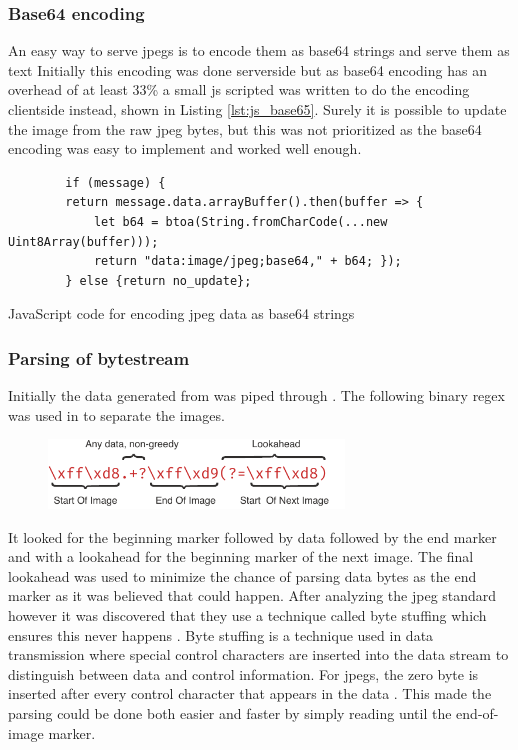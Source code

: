 \subsubsection{Base64 encoding}
An easy way to serve \glspl{jpeg} is to encode them as base64 strings and serve them as text \cite{rAnswerHowDisplay2013}
Initially this encoding was done serverside but as base64 encoding has an overhead of at least 33\% a small \gls{js} scripted was written to do the encoding clientside instead, shown in Listing \ref{lst:js_base65}.
Surely it is possible to update the image from the raw \gls{jpeg} bytes, but this was not prioritized as the base64 encoding was easy to implement and worked well enough.
\begin{listing}
    \begin{verbatim}
        if (message) {
        return message.data.arrayBuffer().then(buffer => {
            let b64 = btoa(String.fromCharCode(...new Uint8Array(buffer)));
            return "data:image/jpeg;base64," + b64; });
        } else {return no_update};
    \end{verbatim}
    \label{lst:js_base64}
    \caption{JavaScript code for encoding \gls{jpeg} data as base64 strings}
\end{listing}

\subsubsection{Parsing of bytestream}
Initially the data generated from \gs was piped through .
The following binary \gls{regex} was used in to separate the images.
\begin{figure}[H]
    \centering
    \includegraphics[width=0.7\textwidth]{figures/jpeg_regex.pdf}
\end{figure}
It looked for the beginning marker followed by data followed by the end marker and with a lookahead for the beginning marker of the next image.
The final lookahead was used to minimize the chance of parsing data bytes as the end marker as it was believed that could happen.
After analyzing the \gls{jpeg} standard however it was discovered that they use a technique called byte stuffing which ensures this never happens \cite[91]{ccittINFORMATIONTECHNOLOGYDIGITAL1992}.
Byte stuffing is a technique used in data transmission where special control characters are inserted into the data stream to distinguish between data and control information.
For \glspl{jpeg}, the zero byte is inserted after every control character that appears in the data \cite[91]{ccittINFORMATIONTECHNOLOGYDIGITAL1992}.
This made the parsing could be done both easier and faster by simply reading until the end-of-image marker.

